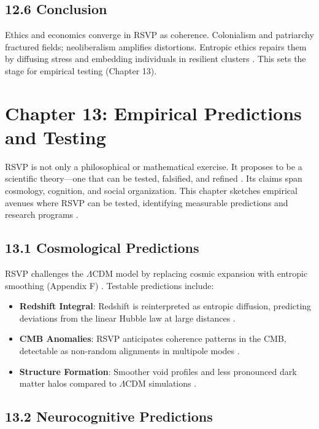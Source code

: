 \documentclass[12pt]{article}
\begin{document}
{{\subsection*{12.6 Conclusion}

Ethics and economics converge in RSVP as coherence. Colonialism and patriarchy fractured fields; neoliberalism amplifies distortions. Entropic ethics repairs them by diffusing stress and embedding individuals in resilient clusters \citep{deleuze1987}. This sets the stage for empirical testing (Chapter 13).

\section*{Chapter 13: Empirical Predictions and Testing}

RSVP is not only a philosophical or mathematical exercise. It proposes to be a scientific theory—one that can be tested, falsified, and refined \citep{jaynes2003}. Its claims span cosmology, cognition, and social organization. This chapter sketches empirical avenues where RSVP can be tested, identifying measurable predictions and research programs \citep{baez2011}.

\subsection*{13.1 Cosmological Predictions}

RSVP challenges the \(\Lambda\)CDM model by replacing cosmic expansion with entropic smoothing (Appendix F) \citep{whitehead1978}. Testable predictions include:
\begin{itemize}
    \item \textbf{Redshift Integral}: Redshift is reinterpreted as entropic diffusion, predicting deviations from the linear Hubble law at large distances \citep{gromov1999}.
    \item \textbf{CMB Anomalies}: RSVP anticipates coherence patterns in the CMB, detectable as non-random alignments in multipole modes \citep{baez2011}.
    \item \textbf{Structure Formation}: Smoother void profiles and less pronounced dark matter halos compared to \(\Lambda\)CDM simulations \citep{whitehead1978}.
\end{itemize}

\subsection*{13.2 Neurocognitive Predictions}

}}
\end{document}
